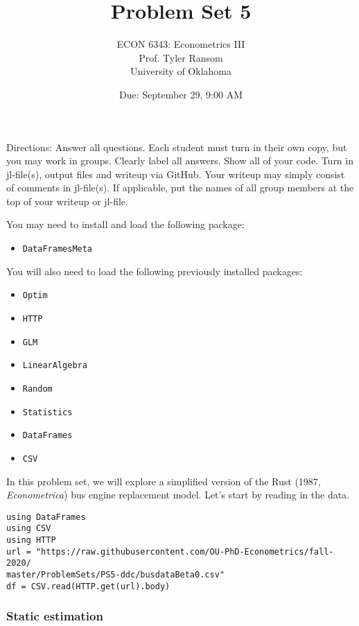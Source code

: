\documentclass[12pt,english]{article}
\begin{document}
\title{Problem Set 5}
\author{ECON 6343: Econometrics III\\
Prof. Tyler Ransom\\
University of Oklahoma}
\date{Due: September 29, 9:00 AM}

\maketitle
Directions: Answer all questions. Each student must turn in their own copy, but you may work in groups. Clearly label all answers. Show all of your code. Turn in jl-file(s), output files and writeup via GitHub. Your writeup may simply consist of comments in jl-file(s). If applicable, put the names of all group members at the top of your writeup or jl-file.

You may need to install and load the following package:
\begin{itemize}
    \item[~] \texttt{DataFramesMeta}
\end{itemize}

You will also need to load the following previously installed packages:
\begin{itemize}
    \item[~] \texttt{Optim} 
    \item[~] \texttt{HTTP} 
    \item[~] \texttt{GLM} 
    \item[~] \texttt{LinearAlgebra} 
    \item[~] \texttt{Random} 
    \item[~] \texttt{Statistics} 
    \item[~] \texttt{DataFrames} 
    \item[~] \texttt{CSV} 
\end{itemize}
\pagebreak
In this problem set, we will explore a simplified version of the Rust (1987, \textit{Econometrica}) bus engine replacement model. Let's start by reading in the data.

\begin{verbatim}
using DataFrames
using CSV
using HTTP
url = "https://raw.githubusercontent.com/OU-PhD-Econometrics/fall-2020/
master/ProblemSets/PS5-ddc/busdataBeta0.csv"
df = CSV.read(HTTP.get(url).body)
\end{verbatim}


\subsubsection*{Static estimation}
\end{document}
